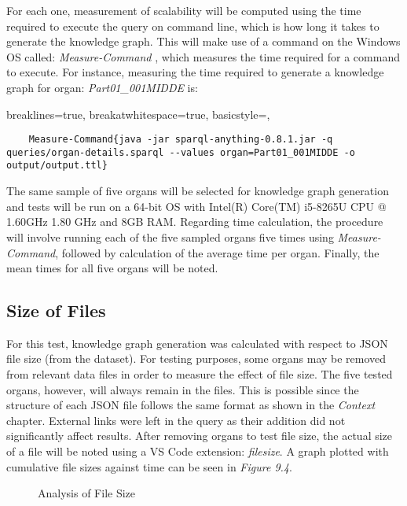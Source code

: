 For each one, measurement of scalability will be computed using the time required to execute the query on command line, which is how long it takes to generate the knowledge graph. This will make use of a command on the Windows OS called: \textit{Measure-Command} \cite{measurecommand}, which measures the time required for a command to execute. For instance, measuring the time required to generate a knowledge graph for organ: \textit{Part01\_001MIDDE} is:

\lstset
{
    breaklines=true,
    breakatwhitespace=true,
    basicstyle=\linespread{1.5}\ttfamily,
}
\begin{lstlisting}
    Measure-Command{java -jar sparql-anything-0.8.1.jar -q queries/organ-details.sparql --values organ=Part01_001MIDDE -o output/output.ttl}
\end{lstlisting}

The same sample of five organs will be selected for knowledge graph generation and tests will be run on a 64-bit OS with Intel(R) Core(TM) i5-8265U CPU @ 1.60GHz 1.80 GHz and 8GB RAM. Regarding time calculation, the procedure will involve running each of the five sampled organs five times using \textit{Measure-Command}, followed by calculation of the average time per organ. Finally, the mean times for all five organs will be noted.

\subsection{Size of Files}
\hspace{0.5cm} For this test, knowledge graph generation was calculated with respect to JSON file size (from the dataset). For testing purposes, some organs may be removed from relevant data files in order to measure the effect of file size. The five tested organs, however, will always remain in the files. This is possible since the structure of each JSON file follows the same format as shown in the \textit{Context} chapter. External links were left in the query as their addition did not significantly affect results. After removing organs to test file size, the actual size of a file will be noted using a VS Code extension: \textit{filesize}. A graph plotted with cumulative file sizes against time can be seen in \textit{Figure 9.4}.

\begin{figure}[H]
\begin{center}
\end{center}
\vspace{-0.75cm}
\caption{Analysis of File Size}
\end{figure}

